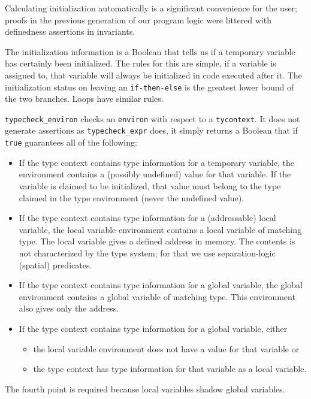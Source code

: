 \documentclass{puthesis}
\begin{document}
Calculating initialization automatically is a significant convenience
for the user; proofs in the previous generation of our program logic
were littered with definedness assertions in invariants.

The initialization information is a Boolean that tells us if a
temporary variable has certainly been initialized. The rules for this
are simple, if a variable is assigned to, that variable will always be
initialized in code executed after it.  The initialization status on
leaving an \lstinline|if-then-else| is the greatest lower bound of the
two branches. Loops have similar rules.


\lstinline|typecheck_environ| checks an \lstinline|environ| with
respect to a \lstinline|tycontext|.  It does not generate assertions
as \lstinline|typecheck_expr| does, it simply returns a Boolean that
if \lstinline{true} guarantees all of the following:

\begin{itemize}
\item If the type context contains type information for a temporary
  variable, the environment contains a (possibly undefined) value for
  that variable. If the variable is claimed to be initialized, that
  value must belong to the type claimed in the type environment (never
  the undefined value).
\item If the type context contains type information for a
  (addressable) local variable, the local variable environment
  contains a local variable of matching type. The local variable gives
  a defined address in memory.  The contents is not characterized by
  the type system; for that we use separation-logic (spatial)
  predicates.
\item If the type context contains type information for a global
  variable, the global environment contains a global variable of
  matching type. This environment also gives only the address.
\item If the type context contains type information for a global
  variable, either
  \begin{itemize}
  \item the local variable environment does not have a value for that
    variable or
  \item the type context has type information for that variable as a
    local variable.
  \end{itemize}
\end{itemize}

\noindent The fourth point is required because local variables shadow global
variables.
\end{document}
